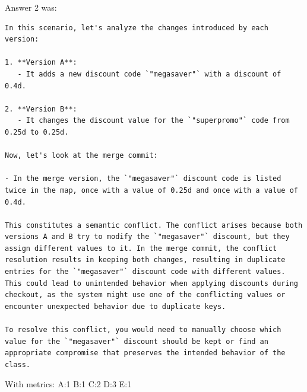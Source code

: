 Answer 2 was:
\begin{lstlisting}
In this scenario, let's analyze the changes introduced by each version:

1. **Version A**:
   - It adds a new discount code `"megasaver"` with a discount of 0.4d.

2. **Version B**:
   - It changes the discount value for the `"superpromo"` code from 0.25d to 0.25d.

Now, let's look at the merge commit:

- In the merge version, the `"megasaver"` discount code is listed twice in the map, once with a value of 0.25d and once with a value of 0.4d.

This constitutes a semantic conflict. The conflict arises because both versions A and B try to modify the `"megasaver"` discount, but they assign different values to it. In the merge commit, the conflict resolution results in keeping both changes, resulting in duplicate entries for the `"megasaver"` discount code with different values. This could lead to unintended behavior when applying discounts during checkout, as the system might use one of the conflicting values or encounter unexpected behavior due to duplicate keys.

To resolve this conflict, you would need to manually choose which value for the `"megasaver"` discount should be kept or find an appropriate compromise that preserves the intended behavior of the class.
\end{lstlisting}

With metrics:
A:1
B:1
C:2
D:3
E:1

